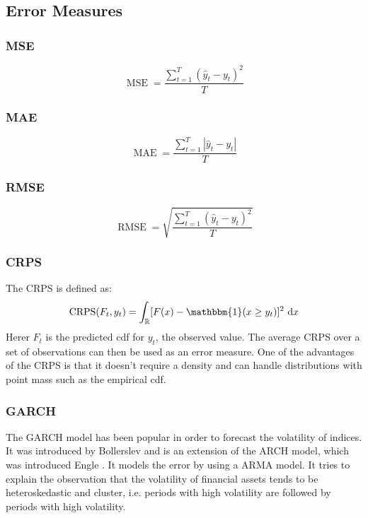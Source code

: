 \documentclass[11pt,a4paper]{article}
\begin{document}
\subsection{Error Measures}\label{sec:error-measures}

\subsubsection*{\ac{MSE}}
\begin{equation}
	\operatorname{MSE}=\frac{\sum_{t=1}^T\left(\hat{y}_t-y_t\right)^2}{T}
\end{equation}

\subsubsection*{\ac{MAE}}
\begin{equation}
	\operatorname{MAE}=\frac{\sum_{t=1}^T |\hat{y}_t-y_t |}{T}
\end{equation}

\subsubsection*{\ac{RMSE}}
\begin{equation}
	\operatorname{RMSE}=\sqrt{\frac{\sum_{t=1}^T\left(\hat{y}_t-y_t\right)^2}{T}}
\end{equation}

\subsubsection*{\ac{CRPS}}
The \ac{CRPS} is defined as:
\begin{equation}
	\operatorname{CRPS}(F_t, y_t)=\int_{\mathbb{R}}[F(x) - \mathbbm{1} (x \geq y_t)]^2 \mathrm{~d} x
\end{equation}
Herer $F_t$ is the predicted \ac{cdf} for $y_t$, the observed value. The average CRPS over a set of observations can then be used as an error measure. One of the advantages of the CRPS is that it doesn't require a density and can handle distributions with point mass such as the empirical \ac{cdf}.

\subsubsection{GARCH}
\label{sss:GARCH}
The \ac{GARCH} model has been popular in order to forecast the volatility of indices. It was introduced  by Bollerslev \cite{bollerslev_generalized_1986} and is an extension of the ARCH model, which was introduced Engle \cite{engle_autoregressive_1982}. It models the error by using a \ac{ARMA} model.
It tries to explain the observation that the volatility of financial assets tends to be heteroskedastic and cluster, i.e. periods with high volatility are followed by periods with high volatility.
\end{document}
